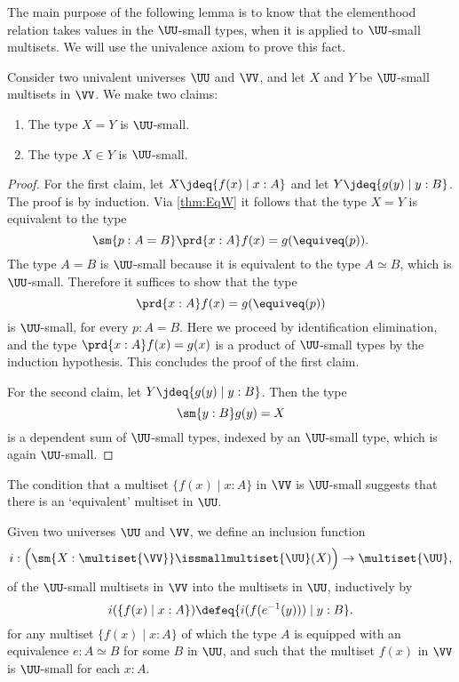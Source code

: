 The main purpose of the following lemma is to know that the elementhood relation takes values in the $\UU$-small types, when it is applied to $\UU$-small multisets. We will use the univalence axiom to prove this fact. 

\begin{prp}\label{prp:is-small-elementhood-multiset}
  Consider two univalent universes $\UU$ and $\VV$, and let $X$ and $Y$ be $\UU$-small multisets in $\VV$. We make two claims:
  \begin{enumerate}
  \item The type $X=Y$ is $\UU$-small.
  \item The type $X\in Y$ is $\UU$-small.
  \end{enumerate}
\end{prp}

\begin{proof}
  For the first claim, let $X\jdeq\{f(x)\mid x : A\}$ and let $Y\jdeq\{g(y)\mid y:B\}$. The proof is by induction. Via \cref{thm:EqW} it follows that the type $X=Y$ is equivalent to the type
  \begin{equation*}
    \sm{p:A=B}\prd{x:A}f(x)=g(\equiveq(p)).
  \end{equation*}
  The type $A=B$ is $\UU$-small because it is equivalent to the type $A\simeq B$, which is $\UU$-small. Therefore it suffices to show that the type
  \begin{equation*}
    \prd{x:A}f(x)=g(\equiveq(p))
  \end{equation*}
  is $\UU$-small, for every $p:A=B$. Here we proceed by identification elimination, and the type $\prd{x:A}f(x)=g(x)$ is a product of $\UU$-small types by the induction hypothesis. This concludes the proof of the first claim.

  For the second claim, let $Y\jdeq\{g(y)\mid y:B\}$. Then the type
  \begin{equation*}
    \sm{y:B}g(y)=X
  \end{equation*}
  is a dependent sum of $\UU$-small types, indexed by an $\UU$-small type, which is again $\UU$-small.
\end{proof}

The condition that a multiset $\{f(x)\mid x:A\}$ in $\VV$ is $\UU$-small suggests that there is an `equivalent' multiset in $\UU$. 

\begin{defn}\label{defn:inclusion-small-multisets}
  Given two universes $\UU$ and $\VV$, we define an inclusion function
  \begin{equation*}
    i : \Big(\sm{X:\multiset{\VV}}\issmallmultiset{\UU}(X)\Big)\to\multiset{\UU},
  \end{equation*}
  of the $\UU$-small multisets in $\VV$ into the multisets in $\UU$, inductively by
  \begin{equation*}
    i(\{f(x)\mid x:A\})\defeq \{i(f(e^{-1}(y))) \mid y:B\}.
  \end{equation*}
  for any multiset $\{f(x)\mid x:A\}$ of which the type $A$ is equipped with an equivalence $e:A\simeq B$ for some $B$ in $\UU$, and such that the multiset $f(x)$ in $\VV$ is $\UU$-small for each $x:A$.
\end{defn}

